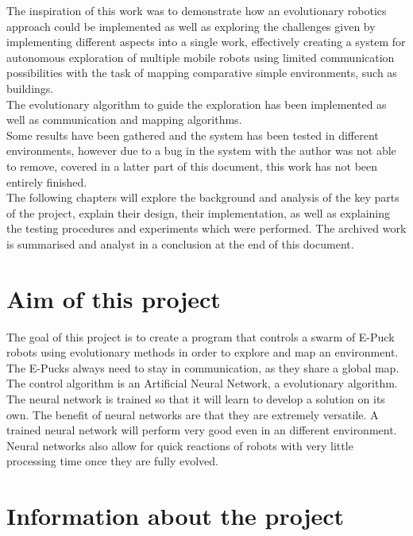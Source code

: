 The inspiration of this work was to demonstrate how an evolutionary robotics approach could be implemented as well as exploring the challenges given by implementing different aspects into a single work, effectively creating a system for autonomous exploration of multiple mobile robots using limited communication possibilities with the task of mapping comparative simple environments, such as buildings. \\
The evolutionary algorithm to guide the exploration has been implemented as well as communication and mapping algorithms. \\
Some results have been gathered and the system has been tested in different environments, however due to a bug in the system with the author was not able to remove, covered in a latter part of this document,  this work has not been entirely finished. \\

The following chapters will explore the background and analysis of the key parts of the project, explain their design, their implementation, as well as explaining the testing procedures and experiments which were performed. 
The archived work is summarised and analyst in a conclusion at the end of this document.\\



\section{Aim of this project}
The goal of this project is to create a program that controls a swarm of E-Puck robots using evolutionary methods in order to explore and  map an environment. \\
The E-Pucks always need to stay in communication, as they share a global map. \\
The control algorithm is an Artificial Neural Network, a evolutionary algorithm. \\
The neural network is trained so that it will learn to develop a solution on its own.
The benefit of neural networks are that they are extremely versatile. A trained neural network will perform very good even in an different environment. Neural networks also allow for quick reactions of robots with very little processing time once they are fully evolved.  

\section{Information about the project}
